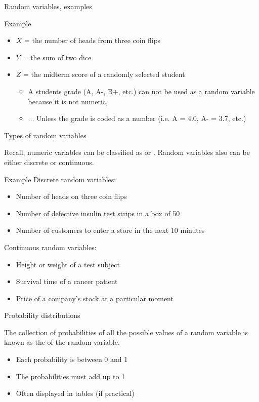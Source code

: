 \documentclass[xcolor=table, aspectratio=169, bigger, handout]{beamer}
\begin{document}
\begin{frame}{Random variables, examples}
\begin{exampleblock}{Example}
\begin{itemize}
\item $X$ = the number of heads from three coin flips
\item $Y$ = the sum of two dice
\item $Z$ = the midterm score of a randomly selected student
\begin{itemize}
\item A students grade (A, A-, B+, etc.) can not be used as a random variable because it is not numeric,
\item ... Unless the grade is coded as a number (i.e. A = 4.0, A- = 3.7, etc.)
\end{itemize}
\end{itemize}
\end{exampleblock}
\end{frame}

\begin{frame}{Types of random variables}
\begin{block}{}
Recall, numeric variables can be classified as  or . Random variables also can be either discrete or continuous.
\end{block}

\pause
\begin{exampleblock}{Example}
Discrete random variables:
\begin{itemize}
\item Number of heads on three coin flips
\item Number of defective insulin test strips in a box of 50
\item Number of customers to enter a store in the next 10 minutes
\end{itemize}
\pause
Continuous random variables:
\begin{itemize}
\item Height or weight of a test subject
\item Survival time of a cancer patient
\item Price of a company's stock at a particular moment
\end{itemize}
\end{exampleblock}
\end{frame}

\begin{frame}{Probability distributions}
\begin{block}{}
The collection of probabilities of all the possible values of a random variable is known as the  of the random variable.

\begin{itemize}
\pause\item Each probability is between 0 and 1
\pause\item The probabilities must add up to 1
\pause\item Often displayed in tables (if practical)
\end{itemize}
\end{block}
\end{frame}
\end{document}
